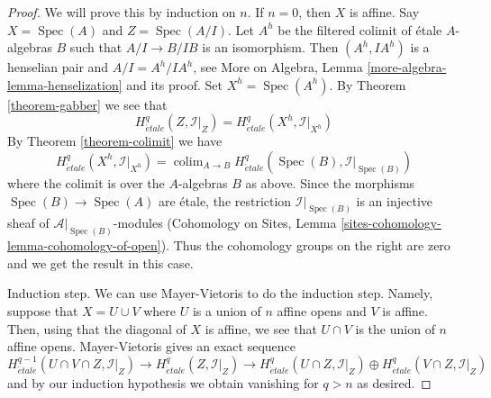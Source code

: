 \documentclass[10pt,a4paper]{amsart}
\theoremstyle{plain}
\theoremstyle{definition}
\theoremstyle{remark}
\numberwithin{equation}{subsection}
\def\colim{\mathop{\mathrm{colim}}\nolimits}
\def\Spec{\mathop{\mathrm{Spec}}}
\def\etale{{\acute{e}tale}}
\begin{document}
\begin{proof}
We will prove this by induction on $n$. If $n = 0$, then $X$ is affine.
Say $X = \Spec(A)$ and $Z = \Spec(A/I)$. Let $A^h$ be the filtered colimit
of \'etale $A$-algebras $B$ such that $A/I \to B/IB$ is an isomorphism.
Then $(A^h, IA^h)$ is a henselian pair and $A/I = A^h/IA^h$, see
More on Algebra, Lemma \ref{more-algebra-lemma-henselization}
and its proof. Set $X^h = \Spec(A^h)$.
By Theorem \ref{theorem-gabber}
we see that
$$
H^q_\etale(Z, \mathcal{I}|_Z) = H^q_\etale(X^h, \mathcal{I}|_{X^h})
$$
By Theorem \ref{theorem-colimit} we have
$$
H^q_\etale(X^h, \mathcal{I}|_{X^h}) =
\colim_{A \to B} H^q_\etale(\Spec(B), \mathcal{I}|_{\Spec(B)})
$$
where the colimit is over the $A$-algebras $B$ as above.
Since the morphisms $\Spec(B) \to \Spec(A)$ are \'etale,
the restriction $\mathcal{I}|_{\Spec(B)}$ is an injective
sheaf of $\mathcal{A}|_{\Spec(B)}$-modules
(Cohomology on Sites, Lemma \ref{sites-cohomology-lemma-cohomology-of-open}).
Thus the cohomology groups on the right are zero and we get the
result in this case.

\medskip\noindent
Induction step. We can use Mayer-Vietoris to do the induction step.
Namely, suppose that $X = U \cup V$ where $U$ is a union of $n$ affine
opens and $V$ is affine. Then, using that the diagonal of $X$ is affine,
we see that $U \cap V$ is the union of $n$ affine opens. Mayer-Vietoris
gives an exact sequence
$$
H^{q - 1}_\etale(U \cap V \cap Z, \mathcal{I}|_Z) \to
H^q_\etale(Z, \mathcal{I}|_Z) \to
H^q_\etale(U \cap Z, \mathcal{I}|_Z) \oplus
H^q_\etale(V \cap Z, \mathcal{I}|_Z)
$$
and by our induction hypothesis we obtain vanishing for $q > n$ as desired.
\end{proof}
\end{document}
